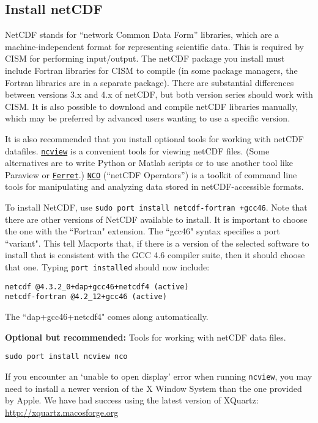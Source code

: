 \subsection{Install netCDF}
\label{sec:install-netcdf}
NetCDF stands for ``network Common Data Form'' libraries, which are a
 machine-independent format for representing scientific data.
This is required by CISM for performing input/output.  The netCDF package you 
install must include Fortran libraries for CISM to compile (in some package managers,
the Fortran libraries are in a separate package).  There are substantial differences 
between versions 3.x and 4.x of netCDF, but both version series should work with CISM. 
It is also possible to download and compile netCDF libraries manually, 
which may be preferred by advanced users wanting to use a specific version.

It is also recommended that you install optional tools for working with netCDF datafiles.
\href{http://meteora.ucsd.edu/~pierce/ncview_home_page.html}{\texttt{ncview}} is a
convenient tools for viewing netCDF files.  
(Some alternatives are to write Python or Matlab scripts or to use another tool like Paraview or
\href{http://ferret.pmel.noaa.gov/Ferret/home}{\texttt{Ferret}}.)  
\href{http://nco.sourceforge.net/}{\texttt{NCO}} (``netCDF Operators'') is a toolkit of command line tools
for manipulating and analyzing data stored in netCDF-accessible formats.

\begin{mdframed}[style=mac] %
To install NetCDF, use \texttt{sudo port install netcdf-fortran +gcc46}. 
Note that there are other versions of NetCDF available to install. It is important 
to choose the one with the ``Fortran" extension. The ``gcc46" syntax specifies a port ``variant". 
This tell Macports that, if there is a version of the selected software 
to install that is consistent with the GCC 4.6 compiler suite, then it should 
choose that one. Typing \texttt{port installed} should now include:

\begin{verbatim}
netcdf @4.3.2_0+dap+gcc46+netcdf4 (active)
netcdf-fortran @4.2_12+gcc46 (active)
\end{verbatim}

The ``dap+gcc46+netcdf4" comes along automatically. 

\textbf{Optional but recommended:} Tools for working with netCDF data files.

\texttt{sudo port install ncview nco}

If you encounter an `unable to open display' error when running \texttt{ncview},
you may need to install a newer version of the X Window System than the one provided by Apple.
We have had success using the latest version of XQuartz:
\href{http://xquartz.macosforge.org}{http://xquartz.macosforge.org}

\end{mdframed}              %



